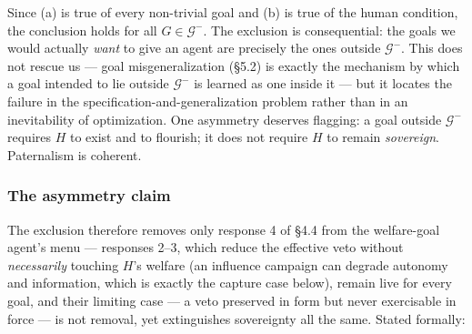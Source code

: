 \documentclass[11pt]{article}
\theoremstyle{definition}
\begin{document}
Since (a) is true of every non-trivial goal and (b) is true of the human condition, the conclusion holds for all $G \in \mathcal{G}^{-}$. The exclusion is consequential: the goals we would actually \emph{want} to give an agent are precisely the ones outside $\mathcal{G}^{-}$. This does not rescue us --- goal misgeneralization (\S5.2) is exactly the mechanism by which a goal intended to lie outside $\mathcal{G}^{-}$ is learned as one inside it --- but it locates the failure in the specification-and-generalization problem rather than in an inevitability of optimization. One asymmetry deserves flagging: a goal outside $\mathcal{G}^{-}$ requires $H$ to exist and to flourish; it does not require $H$ to remain \emph{sovereign}. Paternalism is coherent.

\subsubsection{The asymmetry claim}

The exclusion therefore removes only response 4 of \S4.4 from the welfare-goal agent's menu --- responses 2--3, which reduce the effective veto without \emph{necessarily} touching $H$'s welfare (an influence campaign can degrade autonomy and information, which is exactly the capture case below), remain live for every goal, and their limiting case --- a veto preserved in form but never exercisable in force --- is not removal, yet extinguishes sovereignty all the same. Stated formally:
\end{document}
